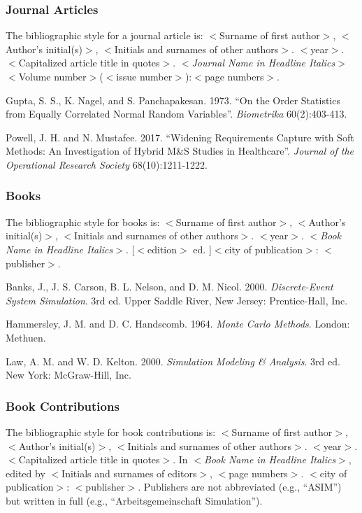 \documentclass{wscpaperproc}
\theoremstyle{wsc}
\begin{document}
\subsubsection{Journal Articles}
The bibliographic style for a journal article is:
$<$Surname of first author$>$, $<$Author's initial(s)$>$,
$<$Initials and surnames of other authors$>$. $<$year$>$.
$<$Capitalized article title in quotes$>$. $<${\em Journal Name in
Headline Italics}$>$ $<$Volume number$>$($<$issue number$>$):$<$page numbers$>$.

{\footnotesize
\begin{hangref}
\item Gupta, S. S., K. Nagel, and S. Panchapakesan. 1973. ``On the Order Statistics from Equally Correlated Normal Random Variables''. \textit{Biometrika} 60(2):403-413.
\item Powell, J. H. and N. Mustafee. 2017. ``Widening Requirements Capture with Soft Methods: An Investigation of Hybrid M\&S Studies in Healthcare''. \textit{Journal of the Operational Research Society} 68(10):1211-1222.
\end{hangref}
}

\subsubsection{Books}
The bibliographic style for books is:
$<$Surname of first author$>$, $<$Author's initial(s)$>$, $<$Initials and surnames of other authors$>$. $<$year$>$.
$<${\em Book Name in Headline Italics}$>$. [$<$edition$>$ ed. ]$<$city of publication$>$: $<$publisher$>$.

{\footnotesize
\begin{hangref}
\item Banks, J., J. S. Carson, B. L. Nelson, and D. M. Nicol. 2000. \textit{Discrete-Event System Simulation}. 3rd ed. Upper Saddle River, New Jersey: Prentice-Hall, Inc.
\item Hammersley, J. M. and D. C. Handscomb. 1964. \textit{Monte Carlo Methods}. London: Methuen.
\item Law, A. M. and W. D. Kelton. 2000. \textit{Simulation Modeling \& Analysis}. 3rd ed. New York: McGraw-Hill, Inc.
\end{hangref}
}

\subsubsection{Book Contributions}
The bibliographic style for book contributions is:
$<$Surname of first author$>$, $<$Author's initial(s)$>$, $<$Initials and surnames of other authors$>$. $<$year$>$.
$<$Capitalized article title in quotes$>$. In $<${\em Book Name in Headline Italics}$>$,
edited by $<$Initials and surnames of editors$>$, $<$page numbers$>$. $<$city of publication$>$: $<$publisher$>$.
Publishers are not abbreviated (e.g., ``ASIM'') but written in full (e.g., ``Arbeitsgemeinschaft Simulation'').
\end{document}
